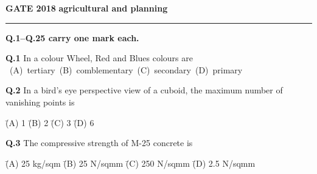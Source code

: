 \documentclass[journal,12pt,onecolumn]{IEEEtran}
\theoremstyle{remark}
\begin{document}
\newpage
\noindent

\textbf{GATE 2018}   \hfill    \textbf{agricultural and planning}
\hrule
\vspace{0.6cm}
\textbf{Q.1--Q.25 carry one mark each.}

\vspace{0.5cm}
\noindent \textbf{Q.1} \hspace{0.4cm} In a colour  Wheel, Red and Blues colours are \\
 
\vspace{0.01 cm}
\noindent \mbox{
\hspace{1.5cm} (A) tertiary
\hspace{2cm} (B) comblementary
\hspace{2cm} (C) secondary
\hspace{2cm} (D) primary
} 

\vspace{0.6cm}

\noindent
\textbf{Q.2}
\hspace{0.5cm} In a bird's eye perspective view of a cuboid, the maximum number of vanishing points is

\vspace{0.5em}

\begin{tabbing}
\hspace{2cm} \= (A) 1 \hspace{2cm} \= (B) 2 \hspace{2cm} \= (C) 3 \hspace{2cm} \= (D) 6
\end{tabbing}

\vspace{1.5em}

\noindent\textbf{Q.3} \hspace{0.5cm} The compressive strength of M-25 concrete is

\vspace{0.5em}

\begin{tabbing}
\hspace{2cm} \= (A) 25 kg/sqm \hspace{1.7cm} \= (B) 25 N/sqmm \hspace{1.7cm} \= (C) 250 N/sqmm \hspace{1.7cm} \= (D) 2.5 N/sqmm
\end{tabbing}

\vspace{1.5em}
\end{document}
